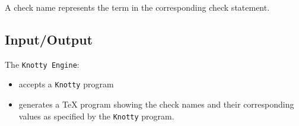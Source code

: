 \documentclass[letterpaper, 12pt]{extarticle}
\theoremstyle{definition} %
\newcommand{\code}[1]{\texttt{#1}}
\newcommand{\kn}{\code{Knotty}}
\newcommand{\kne}{\code{Knotty Engine}}
\newcommand{\tex}{\TeX}
\begin{document}
A check name represents the term
in the corresponding check statement.

\subsection{Input/Output}

The \kne:
\begin{itemize}
\item
accepts a \kn{} program
\item
generates a \tex{} program showing the check names and
their corresponding values
as specified by the \kn{} program.
\end{itemize}

\end{document}
